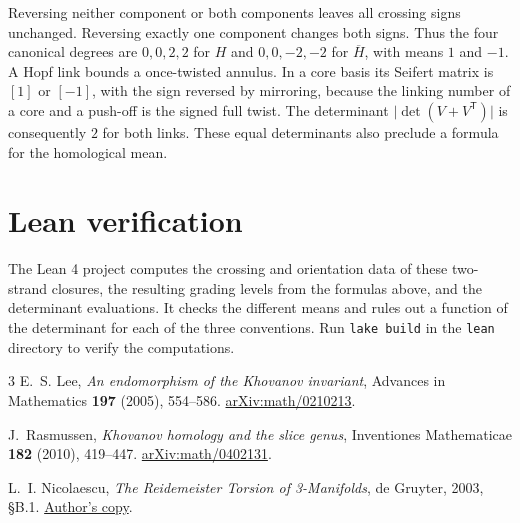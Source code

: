 \documentclass[11pt]{article}
\begin{document}
Reversing neither component or both components leaves all crossing signs
unchanged. Reversing exactly one component changes both signs. Thus the
four canonical degrees are $0,0,2,2$ for $H$ and $0,0,-2,-2$ for
$\overline H$, with means $1$ and $-1$. A Hopf link bounds a once-twisted
annulus. In a core basis its Seifert matrix is $[1]$ or $[-1]$, with the
sign reversed by mirroring, because the linking number of a core and a
push-off is the signed full twist. The determinant
$\lvert\det(V+V^{\mathsf T})\rvert$ is consequently $2$ for both links.
These equal determinants also preclude a formula for the homological mean.

\section*{Lean verification}

The Lean 4 project computes the crossing and orientation data of these
two-strand closures, the resulting grading levels from the formulas
above, and the determinant evaluations. It checks the different means
and rules out a function of the determinant for each of the three
conventions. Run \texttt{lake build} in the \texttt{lean} directory to
verify the computations.

\begin{thebibliography}{3}
E.~S. Lee, \emph{An endomorphism of the Khovanov invariant},
Advances in Mathematics \textbf{197} (2005), 554--586.
\href{https://arxiv.org/abs/math/0210213}{arXiv:math/0210213}.

J.~Rasmussen, \emph{Khovanov homology and the slice genus},
Inventiones Mathematicae \textbf{182} (2010), 419--447.
\href{https://arxiv.org/abs/math/0402131}{arXiv:math/0402131}.

L.~I. Nicolaescu, \emph{The Reidemeister Torsion of 3-Manifolds},
de Gruyter, 2003, \S B.1.
\href{https://www3.nd.edu/~lnicolae/Torsion.pdf}{Author's copy}.
\end{thebibliography}
\end{document}
